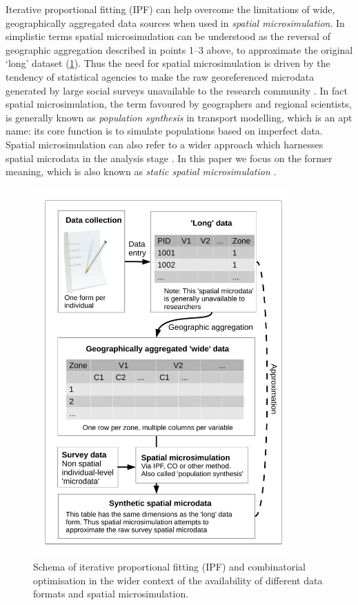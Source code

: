 \documentclass[a4paper,10pt]{article}
\begin{document}
Iterative proportional fitting (IPF) can help overcome the limitations of wide,
 geographically aggregated data
sources when used in
\emph{spatial microsimulation}. In simplistic terms spatial microsimulation can be understood
as the reversal of geographic aggregation described in points 1--3 above,
to approximate the original `long' dataset (\cref{fmsim-schema}).
Thus the need for spatial microsimulation is driven by
the tendency of statistical agencies to make the raw georeferenced microdata generated 
by large social surveys unavailable to the research community \citep{Lee2009}.
In fact spatial microsimulation, the term favoured by geographers and regional scientists, is
generally known as \emph{population synthesis} in transport modelling, which 
is an apt name: its core function is to simulate populations based on 
imperfect data. Spatial microsimulation can also refer to a wider approach which
harnesses spatial microdata in the analysis stage \citep{Holm1987, Lovelace2014-jtg}.
In this paper we focus on the former meaning, which is also known as \emph{static spatial microsimulation}
\citep{Ballas2005c}.

\begin{figure}
\begin{center}
  \includegraphics[width=10cm]{msim-schema}
\end{center}

\caption{Schema of iterative proportional fitting (IPF) and combinatorial optimisation
in the wider context of the availability of different data formats and spatial microsimulation. \label{fmsim-schema}}
\end{figure}
\end{document}
